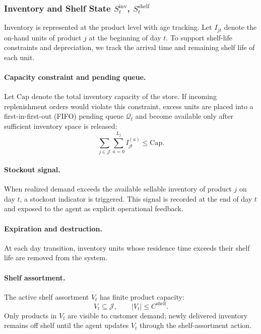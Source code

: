 \subsubsection{Inventory and Shelf State \texorpdfstring{$S_t^{\text{inv}}$, $S_t^{\text{shelf}}$}{S t inv, S t shelf}}

Inventory is represented at the product level with age tracking. Let $I_{jt}$ denote the on-hand units of product $j$ at the beginning of day $t$. To support shelf-life constraints and depreciation, we track the arrival time and remaining shelf life of each unit.

\paragraph{Capacity constraint and pending queue.}
Let $\mathrm{Cap}$ denote the total inventory capacity of the store. If incoming replenishment orders would violate this constraint, excess units are placed into a first-in-first-out (FIFO) pending queue $\mathcal{Q}_t$ and become available only after sufficient inventory space is released:
\begin{equation}
\sum_{j\in\mathcal{J}} \sum_{a=0}^{L_j} I_{jt}^{(a)} \le \mathrm{Cap}.
\end{equation}

\paragraph{Stockout signal.}
When realized demand exceeds the available sellable inventory of product $j$ on day $t$, a stockout indicator is triggered. This signal is recorded at the end of day $t$ and exposed to the agent as explicit operational feedback.

\paragraph{Expiration and destruction.}
At each day transition, inventory units whose residence time exceeds their shelf life are removed from the system.

\paragraph{Shelf assortment.}
The active shelf assortment $V_t$ has finite product capacity:
\begin{equation}
V_t \subseteq \mathcal{J}, \qquad |V_t| \le C^{\mathrm{shelf}}.
\end{equation}
Only products in $V_t$ are visible to customer demand; newly delivered inventory remains off shelf until the agent updates $V_t$ through the shelf-assortment action.

